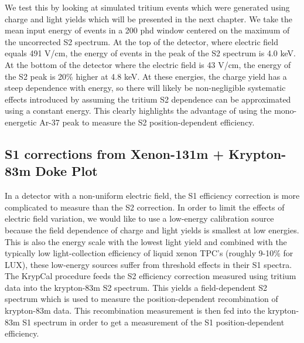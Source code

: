 We test this by looking at simulated tritium events which were generated using charge and light yields which will be presented in the next chapter. We take the mean input energy of events in a 200 phd window centered on the maximum of the uncorrected S2 spectrum. At the top of the detector, where electric field equals 491 V/cm, the energy of events in the peak of the S2 spectrum is 4.0 keV. At the bottom of the detector where the electric field is 43 V/cm, the energy of the S2 peak is 20\% higher at 4.8 keV. At these energies, the charge yield has a steep dependence with energy, so there will likely be non-negligible systematic effects introduced by assuming the tritium S2 dependence can be approximated using a constant energy. This clearly highlights the advantage of using the mono-energetic Ar-37 peak to measure the S2 position-dependent efficiency.

\subsection{S1 corrections from Xenon-131m + Krypton-83m Doke Plot}
In a detector with a non-uniform electric field, the S1 efficiency correction is more complicated to measure than the S2 correction. In order to limit the effects of electric field variation, we would like to use a low-energy calibration source because the field dependence of charge and light yields is smallest at low energies. This is also the energy scale with the lowest light yield and combined with the typically low light-collection efficiency of liquid xenon TPC's (roughly 9-10\% for LUX), these low-energy sources suffer from threshold effects in their S1 spectra. The KrypCal procedure feeds the S2 efficiency correction measured using tritium data into the krypton-83m S2 spectrum. This yields a field-dependent S2 spectrum which is used to measure the position-dependent recombination of krypton-83m data. This recombination measurement is then fed into the krypton-83m S1 spectrum in order to get a measurement of the S1 position-dependent efficiency.


